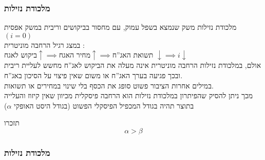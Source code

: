 \documentclass[usenames,dvipsnames]{beamer}
\renewcommand{\a}{\alpha}
\begin{document}
\begin{RTL}
\begin{frame}
\begin{flushleft}
    \end{flushleft}
\end{frame}

\begin{frame}
    \frametitle{מלכודת נזילות}
    \begin{block}{מלכודת נזילות}
        משק שנמצא בשפל עמוק, עם מחסור בביקושים וריבית במשק אפסית $(i=0)$ \\
        במצג רגיל הרחבה מוניטרית : \\
        $\text{ביקוש לאגח} \uparrow \implies \text{מחיר האגח} \uparrow \implies \text{תשואת האג''ח }\downarrow \implies i\downarrow$ \\
        אולם, במלכודת נזילות הרחבה מוניטרית אינה מעלה את הביקוש לאג''ח מחשש לעליית ריבית ובכך פגיעה בערך האג''ח או משום שאין פיצוי על הסיכון באג''ח. \\
        במילים אחרות הציבור פשוט סופג את הכסף בלי שינוי במחירים או תשואות. \\
        מכך ניתן להסיק שהפיתרון במלכודת נזילות הוא הרחבה פיסקלית מכיוון שאין קיזוז והעלייה בתוצר תהיה בגודל המכפיל הפיסקלי הפשוט (בגודל היסט האופקי $\a$)
    \end{block}

    \begin{alertblock}{תזכרו}
        $$\a > \beta$$
    \end{alertblock}
    

\end{frame}

\begin{frame}
    \frametitle{מלכודת נזילות}

    \begin{flushleft}
\end{flushleft}
\end{frame}
\end{RTL}
\end{document}
